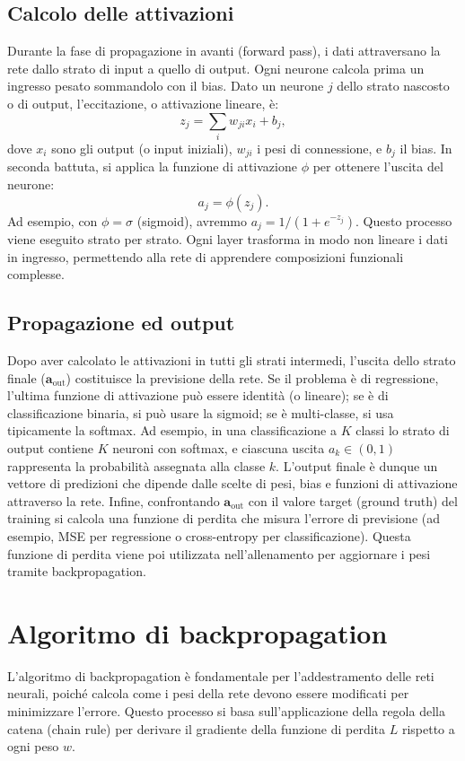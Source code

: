 \documentclass[a4paper,12pt]{report}
\begin{document}
	\subsection{Calcolo delle attivazioni}
	Durante la fase di propagazione in avanti (forward pass), i dati attraversano la rete dallo strato di input a quello di output. Ogni neurone calcola prima un ingresso pesato sommandolo con il bias. Dato un neurone $j$ dello strato nascosto o di output, l'eccitazione, o attivazione lineare, è:
	\[
	z_j = \sum_i w_{ji} x_i + b_j,
	\]
	dove $x_i$ sono gli output (o input iniziali), $w_{ji}$ i pesi di connessione, e $b_j$ il bias. In seconda battuta, si applica la funzione di attivazione $\phi$ per ottenere l'uscita del neurone:
	\[
	a_j = \phi(z_j).
	\]
	Ad esempio, con $\phi=\sigma$ (sigmoid), avremmo $a_j=1/(1+e^{-z_j})$. Questo processo viene eseguito strato per strato. Ogni layer trasforma in modo non lineare i dati in ingresso, permettendo alla rete di apprendere composizioni funzionali complesse.
	
	\subsection{Propagazione ed output}
	Dopo aver calcolato le attivazioni in tutti gli strati intermedi, l'uscita dello strato finale ($\mathbf{a}_{\text{out}}$) costituisce la previsione della rete. Se il problema è di regressione, l'ultima funzione di attivazione può essere identità (o lineare); se è di classificazione binaria, si può usare la sigmoid; se è multi-classe, si usa tipicamente la softmax. Ad esempio, in una classificazione a $K$ classi lo strato di output contiene $K$ neuroni con softmax, e ciascuna uscita $a_k \in (0,1)$ rappresenta la probabilità assegnata alla classe $k$. L'output finale è dunque un vettore di predizioni che dipende dalle scelte di pesi, bias e funzioni di attivazione attraverso la rete. Infine, confrontando $\mathbf{a}_{\text{out}}$ con il valore target (ground truth) del training si calcola una funzione di perdita che misura l'errore di previsione (ad esempio, MSE per regressione o cross-entropy per classificazione). Questa funzione di perdita viene poi utilizzata nell'allenamento per aggiornare i pesi tramite backpropagation.
	
	\section{Algoritmo di backpropagation}
	L'algoritmo di backpropagation è fondamentale per l'addestramento delle reti neurali, poiché calcola come i pesi della rete devono essere modificati per minimizzare l'errore. Questo processo si basa sull'applicazione della regola della catena (chain rule) per derivare il gradiente della funzione di perdita $L$ rispetto a ogni peso $w$.
	
\end{document}

